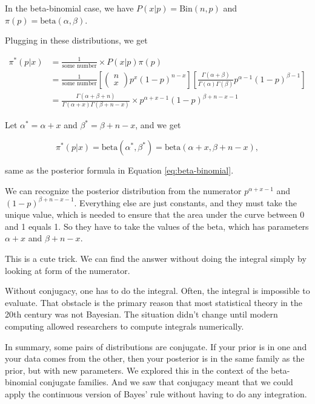 \documentclass[]{book}
\theoremstyle{definition}
\theoremstyle{definition}
\theoremstyle{definition}
\theoremstyle{remark}
\begin{document}
In the beta-binomial case, we have \(P(x|p)=\text{Bin}(n,p)\) and
\(\pi(p)=\text{beta}(\alpha,\beta)\).

Plugging in these distributions, we get

\[\begin{aligned}
\pi^*(p|x) &= \frac{1}{\text{some number}} \times P(x|p)\pi(p) \\
&= \frac{1}{\text{some number}} [\left( \begin{array}{c} n \\ x \end{array} \right) p^x (1-p)^{n-x}] [\frac{\Gamma(\alpha+\beta)}{\Gamma(\alpha)\Gamma(\beta)} p^{\alpha-1} (1-p)^{\beta-1}] \\
&= \frac{\Gamma(\alpha+\beta+n)}{\Gamma(\alpha+x)\Gamma(\beta+n-x)} \times p^{\alpha+x-1} (1-p)^{\beta+n-x-1}
\end{aligned}\]

Let \(\alpha^* = \alpha + x\) and \(\beta^* = \beta+n-x\), and we get

\[\pi^*(p|x) = \text{beta}(\alpha^*,\beta^*) = \text{beta}(\alpha+x, \beta+n-x),\]

same as the posterior formula in Equation \eqref{eq:beta-binomial}.

We can recognize the posterior distribution from the numerator
\(p^{\alpha+x-1}\) and \((1-p)^{\beta+n-x-1}\). Everything else are just
constants, and they must take the unique value, which is needed to
ensure that the area under the curve between 0 and 1 equals 1. So they
have to take the values of the beta, which has parameters \(\alpha+x\)
and \(\beta+n-x\).

This is a cute trick. We can find the answer without doing the integral
simply by looking at form of the numerator.

Without conjugacy, one has to do the integral. Often, the integral is
impossible to evaluate. That obstacle is the primary reason that most
statistical theory in the 20th century was not Bayesian. The situation
didn't change until modern computing allowed researchers to compute
integrals numerically.

In summary, some pairs of distributions are conjugate. If your prior is
in one and your data comes from the other, then your posterior is in the
same family as the prior, but with new parameters. We explored this in
the context of the beta-binomial conjugate families. And we saw that
conjugacy meant that we could apply the continuous version of Bayes'
rule without having to do any integration.
\end{document}
